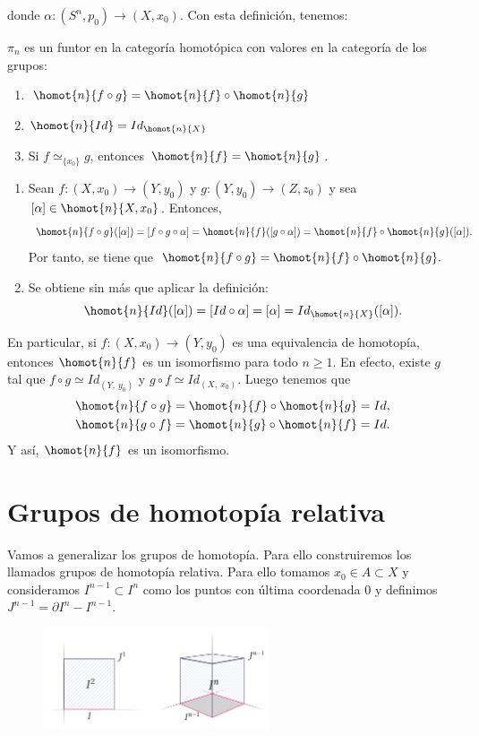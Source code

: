 donde $\alpha : (S^n, p_0) \longrightarrow (X, x_0)$.
Con esta definición, tenemos:
\begin{prop}
$\pi_n$ es un funtor en la categoría homotópica con valores en la categoría de los grupos:
\begin{enumerate}
\item $\homot{n}{f \circ g} = \homot{n}{f} \circ \homot{n}{g}$
\item $\homot{n}{Id} = Id_{\homot{n}{X}}$
\item Si $f \simeq_{\{x_0\}} g$, entonces $\homot{n}{f} = \homot{n}{g}$.
\end{enumerate}
\end{prop}
\begin{demo}
\begin{enumerate}
\item Sean $f: (X, x_0) \longrightarrow (Y, y_0)$ y $g: (Y, y_0) \longrightarrow (Z, z_0)$ y sea $[\alpha] \in \homot{n}{X, x_0}$. Entonces,
\[
\homot{n}{f \circ g}([\alpha]) = [f \circ g \circ \alpha] = \homot{n}{f}([g \circ \alpha]) = \homot{n}{f} \circ \homot{n}{g}([\alpha]).
\]
Por tanto, se tiene que $\homot{n}{f \circ g} = \homot{n}{f} \circ \homot{n}{g}.$
\item Se obtiene sin más que aplicar la definición:
\[
\homot{n}{Id}([\alpha]) = [Id \circ \alpha] = [\alpha] = Id_{\homot{n}{X}}([\alpha]).
\]
\end{enumerate}
\end{demo}
En particular, si $f : (X, x_0) \longrightarrow (Y, y_0)$ es una equivalencia de homotopía, entonces $\homot{n}{f}$ es un isomorfismo para todo $n \geq 1$. En efecto, existe $g$ tal que $f \circ g \simeq Id_{(Y, \ y_0)}$ y $g \circ f \simeq Id_{(X, \ x_0)}$. 
Luego tenemos que 
\begin{align*}
\homot{n}{f \circ g} = \homot{n}{f} \circ \homot{n}{g} = Id, \\
\homot{n}{g \circ f} = \homot{n}{g} \circ \homot{n}{f} = Id.
\end{align*}
Y así, $\homot{n}{f}$ es un isomorfismo.

\section{Grupos de homotopía relativa}
Vamos a generalizar los grupos de homotopía. Para ello construiremos los llamados grupos de homotopía relativa. Para ello tomamos $x_0 \in A \subset X$ y consideramos $I^{n-1} \subset I^n$ como los puntos con última coordenada $0$ y  definimos  $J^{n-1} = \partial I^n - I^{n-1}$. \par
\begin{figure}[h]
\centering
\includegraphics[width = 0.6\textwidth]{images/defghomot}
\end{figure}

